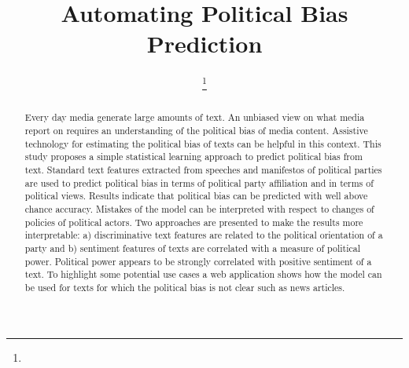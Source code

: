 \documentclass[runningheads,a4paper]{llncs}
\begin{document}
\mainmatter  %

\title{Automating Political Bias Prediction}


%
%
\author{
\thanks{}
%
}


%
%

\tocauthor{}
\maketitle

\begin{abstract} 
Every day media generate large amounts of text. An unbiased view on what media report on requires an understanding of the political bias of media content. Assistive technology for estimating the political bias of texts can be helpful in this context. This study proposes a simple statistical learning approach to predict political bias from text. Standard text features extracted from speeches and manifestos of political parties are used to predict political bias in terms of political party affiliation and in terms of political views. Results indicate that political bias can be predicted with well above chance accuracy. Mistakes of the model can be interpreted with respect to changes of policies of political actors. Two approaches are presented to make the results more interpretable: a) discriminative text features are related to the political orientation of a party and b) sentiment features of texts are correlated with a measure of political power. Political power appears to be strongly correlated with positive sentiment of a text. To highlight some potential use cases a web application shows how the model can be used for texts for which the political bias is not clear such as news articles.
\end{abstract} 
\end{document}
